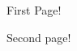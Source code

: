 \documentclass{paper}
\begin{document}
\maketitle

First Page!

\newpage
Second page!
\end{document}
